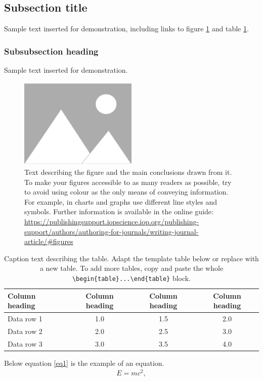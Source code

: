 \documentclass{iopjournal}
\begin{document}
\subsection{Subsection title}
Sample text inserted for demonstration, including links to figure \ref{fig1} and table \ref{tab1}.

\subsubsection{Subsubsection heading}
Sample text inserted for demonstration.

\begin{figure}
 \centering
        \includegraphics[width=0.5\textwidth]{figure1}
 \caption{Text describing the figure and the main conclusions drawn from it. To make your figures accessible to as many readers as possible, try to avoid using colour as the only means of conveying information. For example, in charts and graphs use different line styles and symbols. Further information is available in the online guide: \href{https://publishingsupport.iopscience.iop.org/publishing-support/authors/authoring-for-journals/writing-journal-article/\#figures}{https://publishingsupport.iopscience.iop.org/publishing-support/authors/authoring-for-journals/writing-journal-article/\#figures}}
\label{fig1}
\end{figure}


\begin{table}
\caption{Caption text describing the table. Adapt the template table below or replace with a new table. To add more tables, copy and paste the whole {\tt \textbackslash begin\{table\}...\textbackslash end\{table\}} block.}
\centering
\begin{tabular}{l c c c}
\hline
Column heading & Column heading & Column heading & Column heading \\
\hline
Data row 1 & 1.0 & 1.5 & 2.0 \\
Data row 2 & 2.0 & 2.5 & 3.0 \\
Data row 3 & 3.0 & 3.5 & 4.0 \\
\hline
\end{tabular}
\label{tab1}
\end{table}
 Below equation \eqref{eq1} is the example of an equation.
\begin{align}
       E = mc^2\label{eq1},
\end{align}
\end{document}
